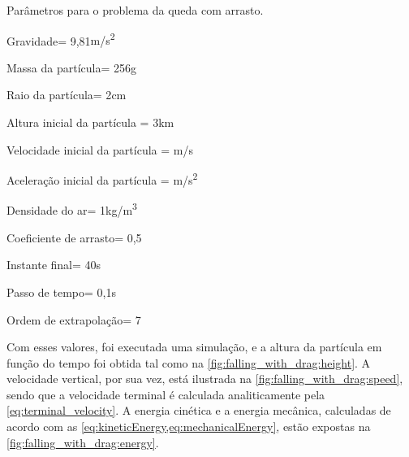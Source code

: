 \begin{table}[h]
\centering
\caption{Parâmetros para o problema da queda com arrasto.}
\label{tab:falling_with_drag:parameters}
\begin{parametersdesc}
	\item{Gravidade}{\gravityScalar = 9,81}{\si[per-mode=symbol]{\metre\per\square\second}}
	\hline
	\item{Massa da partícula}{\mass = 256}{\si\gram}
	\item{Raio da partícula}{\radius = 2}{\si\centi\metre}
	\item{Altura inicial da partícula}{\initial{\positiony} = 3}{\si{\kilo\metre}}
	\item{Velocidade inicial da partícula}{\explicitVector{\initial{\velocityx}}{\initial{\velocityy}}{\initial{\velocityz}} = }{\si[per-mode=symbol]{\metre\per\second}}
	\item{Aceleração inicial da partícula}{\explicitVector{\initial{\accelerationx}}{\initial{\accelerationy}}{\initial{\accelerationz}} = }{\si[per-mode=symbol]{\metre\per\square\second}}
	\hline
	\item{Densidade do ar}{\density = 1}{\si[per-mode=symbol]{\kilogram\per\cubic\meter}}
	\item{Coeficiente de arrasto}{\dragCoefficient = 0,5}{\emptyUnit}
	\hline
	\item{Instante final}{\finalInstant = 40}{\si\second} 
	\item{Passo de tempo}{\Dt = 0,1}{\si\second}
	\item{Ordem de extrapolação}{\taylorOrder = 7}{\emptyUnit}
\end{parametersdesc}
\sourceMe 
\end{table}

Com esses valores, foi executada uma simulação, e a altura da partícula em função do tempo foi obtida tal como na \cref{fig:falling_with_drag:height}. A velocidade vertical, por sua vez, está ilustrada na \cref{fig:falling_with_drag:speed}, sendo que a velocidade terminal é calculada analiticamente pela \cref{eq:terminal_velocity}. A energia cinética e a energia mecânica, calculadas de acordo com as \cref{eq:kineticEnergy,eq:mechanicalEnergy}, estão expostas na \cref{fig:falling_with_drag:energy}.

